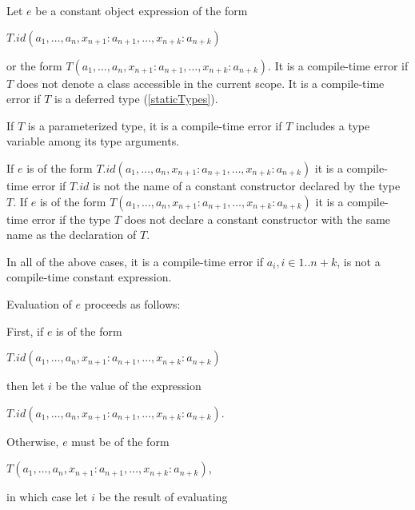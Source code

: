 \documentclass{article}
\begin{document}
\LMHash{}
Let $e$ be a constant object expression of the form  

\CONST{} $T.id(a_1, \ldots , a_n, x_{n+1}: a_{n+1}, \ldots , x_{n+k}: a_{n+k})$ 

or the form  \CONST{} $T(a_1, \ldots , a_n, x_{n+1}: a_{n+1}, \ldots , x_{n+k}: a_{n+k})$. It is a compile-time error if $T$ does not denote a class accessible in the current scope.  It is a compile-time error if $T$ is a deferred type (\ref{staticTypes}).


\LMHash{}
If $T$ is a parameterized type, it is a compile-time error if $T$ includes a type variable among its type arguments.

\LMHash{}
If $e$ is of the form \CONST{} $T.id(a_1, \ldots , a_n, x_{n+1}: a_{n+1}, \ldots , x_{n+k}: a_{n+k})$ it is a compile-time error if $T.id$ is not the name of a constant constructor declared by the type $T$. If $e$ is of the form  \CONST{} $T(a_1, \ldots , a_n, x_{n+1}: a_{n+1}, \ldots , x_{n+k}: a_{n+k})$ it is a compile-time error if the type $T$ does not declare a constant constructor with the same name as the declaration of $T$. 

\LMHash{}
In all of the above cases, it is a compile-time error if $a_i,  i\in 1 .. n + k$, is not a compile-time constant expression.


\LMHash{}
Evaluation of $e$ proceeds as follows:

\LMHash{}
First, if $e$ is of the form 

\CONST{} $T.id(a_1, \ldots , a_n, x_{n+1}: a_{n+1}, \ldots , x_{n+k}: a_{n+k})$ 

then let $i$ be the value of the expression 

\NEW{} $T.id(a_1, \ldots , a_n, x_{n+1}: a_{n+1}, \ldots , x_{n+k}: a_{n+k})$. 

\LMHash{}
Otherwise, $e$ must be of the form  

\CONST{} $T(a_1, \ldots , a_n, x_{n+1}: a_{n+1}, \ldots , x_{n+k}: a_{n+k})$, 

in which case let $i$ be the result of evaluating 
\end{document}
